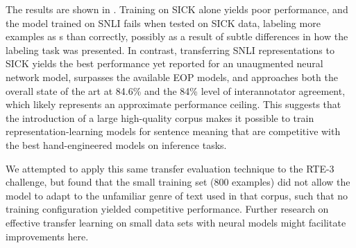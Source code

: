 The results are shown in . Training on SICK alone yields poor performance, and the model trained on SNLI fails when tested on SICK data, labeling more  examples as s than correctly, possibly as a result of subtle differences in how the labeling task was presented. In contrast, transferring SNLI representations to SICK yields the best performance yet reported for an unaugmented neural network model, surpasses the available EOP models, and approaches both the overall state of the art at 84.6\% \cite{lai2014illinois} and the 84\% level of interannotator agreement, which likely represents an approximate performance ceiling. This suggests that the introduction of a large high-quality corpus makes it  possible to train representation-learning models for sentence meaning that are competitive with the best hand-engineered models on inference tasks.

We attempted to apply this same transfer evaluation technique to the RTE-3 challenge, but found that the small training set (800 examples) did not allow the model to adapt to the unfamiliar genre of text used in that corpus, such that no training configuration yielded competitive performance.
Further research on effective transfer learning on small data sets with neural models might facilitate improvements here.



